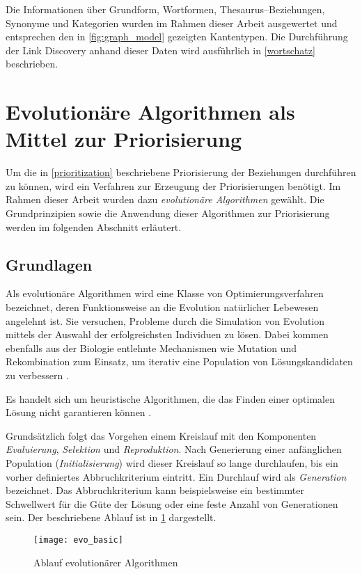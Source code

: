 Die Informationen über Grundform, Wortformen, Thesaurus--Beziehungen, Synonyme und Kategorien wurden im Rahmen dieser Arbeit ausgewertet und entsprechen den in \cref{fig:graph_model} gezeigten Kantentypen. Die Durchführung der Link Discovery anhand dieser Daten wird ausführlich in \cref{wortschatz} beschrieben.

\section{Evolutionäre Algorithmen als Mittel zur Priorisierung}
\label{evo_for_prio}

Um die in \cref{prioritization} beschriebene Priorisierung der Beziehungen durchführen zu können, wird ein Verfahren zur Erzeugung der Priorisierungen benötigt. Im Rahmen dieser Arbeit wurden dazu \emph{evolutionäre Algorithmen} gewählt. Die Grundprinzipien sowie die Anwendung dieser Algorithmen zur Priorisierung werden im folgenden Abschnitt erläutert.

\subsection{Grundlagen}
\label{evo}

Als evolutionäre Algorithmen wird eine Klasse von Optimierungsverfahren bezeichnet, deren Funktionsweise an die Evolution natürlicher Lebewesen angelehnt ist. Sie versuchen, Probleme durch die Simulation von Evolution mittels der Auswahl der erfolgreichsten Individuen zu lösen. Dabei kommen ebenfalls aus der Biologie entlehnte Mechanismen wie Mutation und Rekombination zum Einsatz, um iterativ eine Population von Lösungskandidaten zu verbessern \cite{tw2008}.

Es handelt sich um heuristische Algorithmen, die das Finden einer optimalen Lösung nicht garantieren können \cite[S. 12]{gk2004}.

Grundsätzlich folgt das Vorgehen einem Kreislauf mit den Komponenten \emph{Evaluierung}, \emph{Selektion} und \emph{Reproduktion}. Nach Generierung einer anfänglichen Population (\emph{Initialisierung}) wird dieser Kreislauf so lange durchlaufen, bis ein vorher definiertes Abbruchkriterium eintritt. Ein Durchlauf wird als \emph{Generation} bezeichnet. Das Abbruchkriterium kann beispielsweise ein bestimmter Schwellwert für die Güte der Lösung oder eine feste Anzahl von Generationen sein. Der beschriebene Ablauf ist in \cref{fig:evo_basic} dargestellt.

\begin{figure}[t]
\centering
\texttt{[image: evo\_basic]}
\caption{Ablauf evolutionärer Algorithmen}
\label{fig:evo_basic}
\end{figure}

